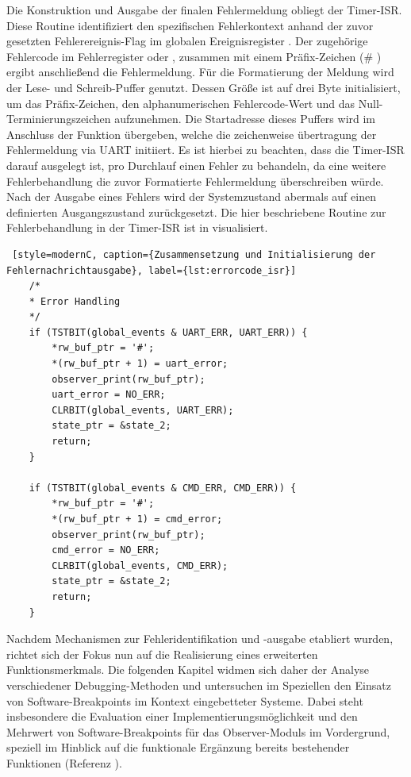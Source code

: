 Die Konstruktion und Ausgabe der finalen Fehlermeldung obliegt der Timer-ISR. Diese Routine identifiziert den spezifischen Fehlerkontext anhand der zuvor gesetzten Fehlerereignis-Flag im globalen Ereignisregister . Der zugeh\"orige Fehlercode im Fehlerregister  oder , zusammen mit einem Pr\"afix-Zeichen (\grq \# \grq) ergibt anschlie{\ss}end die Fehlermeldung. F\"ur die Formatierung der Meldung wird der Lese- und Schreib-Puffer  genutzt. Dessen Gr\"o{\ss}e ist auf drei Byte initialisiert, um das Pr\"afix-Zeichen, den alphanumerischen Fehlercode-Wert und das Null-Terminierungszeichen aufzunehmen. Die Startadresse dieses Puffers wird im Anschluss der Funktion  \"ubergeben, welche die zeichenweise \"ubertragung der Fehlermeldung via UART initiiert. Es ist hierbei zu beachten, dass die Timer-ISR darauf ausgelegt ist, pro Durchlauf einen Fehler zu behandeln, da eine weitere Fehlerbehandlung die zuvor Formatierte Fehlermeldung \"uberschreiben w\"urde. Nach der Ausgabe eines Fehlers wird der Systemzustand abermals auf einen definierten Ausgangszustand zur\"uckgesetzt. Die hier beschriebene Routine zur Fehlerbehandlung in der Timer-ISR ist in  visualisiert.

\newpage
\begin{lstlisting} [style=modernC, caption={Zusammensetzung und Initialisierung der Fehlernachrichtausgabe}, label={lst:errorcode_isr}]
    /*
    * Error Handling
    */
	if (TSTBIT(global_events & UART_ERR, UART_ERR)) {
		*rw_buf_ptr = '#';
		*(rw_buf_ptr + 1) = uart_error;
		observer_print(rw_buf_ptr);
		uart_error = NO_ERR;
		CLRBIT(global_events, UART_ERR);
		state_ptr = &state_2;
		return;
	}
	
	if (TSTBIT(global_events & CMD_ERR, CMD_ERR)) {
		*rw_buf_ptr = '#';
		*(rw_buf_ptr + 1) = cmd_error;
		observer_print(rw_buf_ptr);
		cmd_error = NO_ERR;
		CLRBIT(global_events, CMD_ERR);
		state_ptr = &state_2;
		return;
	}
\end{lstlisting}

\newpage
Nachdem Mechanismen zur Fehleridentifikation und -ausgabe etabliert wurden, richtet sich der Fokus nun auf die Realisierung eines erweiterten Funktionsmerkmals. Die folgenden Kapitel widmen sich daher der Analyse verschiedener Debugging-Methoden und untersuchen im Speziellen den Einsatz von Software-Breakpoints im Kontext eingebetteter Systeme. Dabei steht insbesondere die Evaluation einer Implementierungsm\"oglichkeit und den Mehrwert von Software-Breakpoints f\"ur das Observer-Moduls im Vordergrund, speziell im Hinblick auf die funktionale Erg\"anzung bereits bestehender Funktionen (Referenz ).\AI

